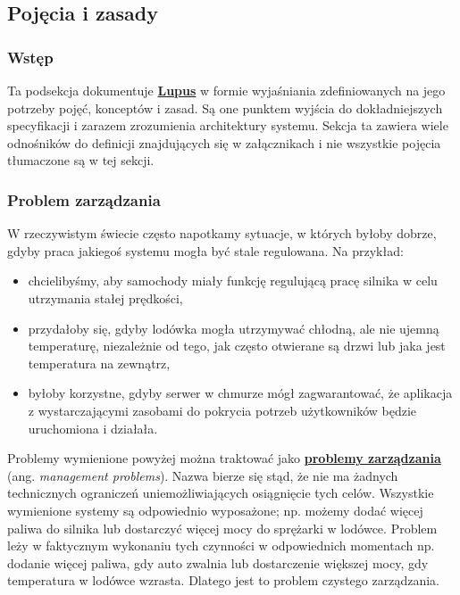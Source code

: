 \subsection{Pojęcia i zasady}

\subsubsection{Wstęp}
Ta podsekcja dokumentuje \hyperlink{def:lupus}{\textbf{Lupus}} w formie wyjaśniania zdefiniowanych na jego potrzeby pojęć, konceptów i zasad. Są one punktem wyjścia do dokładniejszych specyfikacji i zarazem zrozumienia architektury systemu. Sekcja ta zawiera wiele odnośników do definicji znajdujących się w załącznikach i nie wszystkie pojęcia tłumaczone są w tej sekcji.

\subsubsection{Problem zarządzania}

W rzeczywistym świecie często napotkamy sytuacje, w których byłoby dobrze, gdyby praca jakiegoś systemu mogła być stale regulowana. Na przykład:

\begin{itemize}
    \item chcielibyśmy, aby samochody miały funkcję regulującą pracę silnika w celu utrzymania stałej prędkości,
    \item przydałoby się, gdyby lodówka mogła utrzymywać chłodną, ale nie ujemną temperaturę, niezależnie od tego, jak często otwierane są drzwi lub jaka jest temperatura na zewnątrz,
    \item byłoby korzystne, gdyby serwer w chmurze mógł zagwarantować, że aplikacja z wystarczającymi zasobami do pokrycia potrzeb użytkowników będzie uruchomiona i działała.
\end{itemize}

Problemy wymienione powyżej można traktować jako \hyperlink{def:problem-zarzadzania}{\textbf{problemy zarządzania}} (ang. \textit{management problems}). Nazwa bierze się stąd, że nie ma żadnych technicznych ograniczeń uniemożliwiających osiągnięcie tych celów. Wszystkie wymienione systemy są odpowiednio wyposażone; np. możemy dodać więcej paliwa do silnika lub dostarczyć więcej mocy do sprężarki w lodówce. Problem leży w faktycznym wykonaniu tych czynności w odpowiednich momentach np. dodanie więcej paliwa, gdy auto zwalnia lub dostarczenie większej mocy, gdy temperatura w lodówce wzrasta. Dlatego jest to problem czystego zarządzania.

